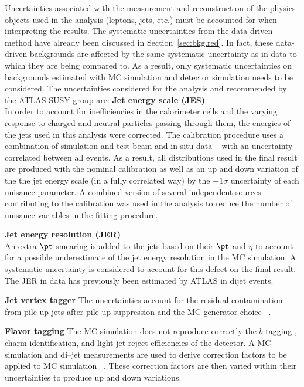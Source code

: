 Uncertainties associated with the measurement and reconstruction of the 
physics objects used in the analysis (leptons, jets, etc.) must be accounted
 for when interpreting the results.
The systematic uncertainties from the data-driven method have already been 
discussed in Section~\ref{sec:bkg.red}. In fact, these data-driven backgrounds 
are affected by the same systematic uncertainty as in data to which they 
are being compared to. As a result, only systematic uncertainties on 
backgrounds estimated with MC simulation and detector simulation needs to 
be considered. The uncertainties considered for the analysis and 
recommended by the ATLAS SUSY group are:
\textbf{Jet energy scale (JES)}  \\  
In order to account for inefficiencies in the calorimeter cells
and the varying response to charged and neutral particles passing through 
them, the energies of the jets used in this analysis were corrected. 
The calibration procedure uses a combination of simulation and test beam 
and in situ data ~\cite{Aaboud:2017jcu} with an uncertainty correlated 
between all events.
As a result, all distributions used in the final result are produced 
with the nominal calibration as well as an up and down variation of the 
the jet energy scale (in a fully correlated way) by the 
$\pm 1\sigma$ uncertainty of each nuisance parameter.
A combined version of several independent sources contributing to the 
calibration was used in the analysis 
to reduce the number of nuisance variables in the fitting procedure.


\textbf{Jet energy resolution (JER)} \\ %
An extra $\pt$ smearing is added to the jets based on their $\pt$ and $\eta$ 
to account for a possible underestimate of the jet energy resolution 
in the MC simulation. A systematic
uncertainty is considered to account for this defect on the final result. 
The JER in data has previously been estimated by ATLAS in dijet events. %


\textbf{Jet vertex tagger}
The uncertainties account for the residual contamination from pile-up jets 
after pile-up suppression and the MC generator choice
~\cite{ATLAS-CONF-2014-018}.

\textbf{Flavor tagging}
The MC simulation does not reproduce correctly the $b$-tagging 
, charm identification, and light jet reject efficiencies of the detector. 
A \ttbar MC simulation and di--jet measurements are used to derive 
correction factors to be applied to MC simulation
~\cite{ATL-PHYS-PUB-2015-022,ATL-PHYS-PUB-2016-012}.
These correction factors are then varied within
their uncertainties to produce up and down variations.


